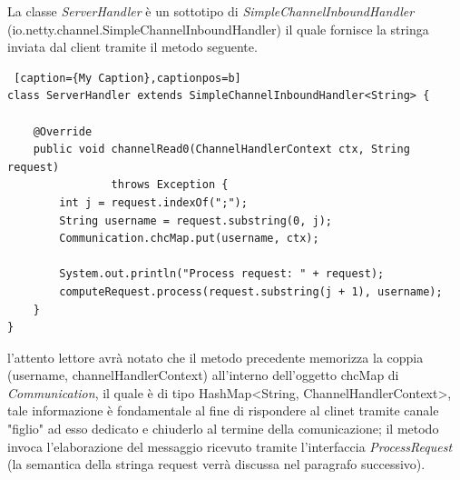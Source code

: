 La classe \textit{ServerHandler} è un sottotipo di \textit{SimpleChannelInboundHandler} \\(io.netty.channel.SimpleChannelInboundHandler) il quale fornisce la stringa inviata dal client tramite il metodo seguente.

\begin{lstlisting} [caption={My Caption},captionpos=b]
class ServerHandler extends SimpleChannelInboundHandler<String> {
	
	@Override
	public void channelRead0(ChannelHandlerContext ctx, String request)
				throws Exception {
		int j = request.indexOf(";");
		String username = request.substring(0, j);
		Communication.chcMap.put(username, ctx);
		
		System.out.println("Process request: " + request);
		computeRequest.process(request.substring(j + 1), username);
	}
}
\end{lstlisting}

l'attento lettore avrà notato che il metodo precedente memorizza la coppia (username, channelHandlerContext) all'interno dell'oggetto chcMap di \textit{Communication}, il quale è di tipo HashMap<String, ChannelHandlerContext>, tale informazione è fondamentale al fine di rispondere al clinet tramite canale "figlio" ad esso dedicato e chiuderlo al termine della comunicazione; il metodo invoca l'elaborazione del messaggio ricevuto tramite l'interfaccia \textit{ProcessRequest} (la semantica della stringa request verrà discussa nel paragrafo successivo).


